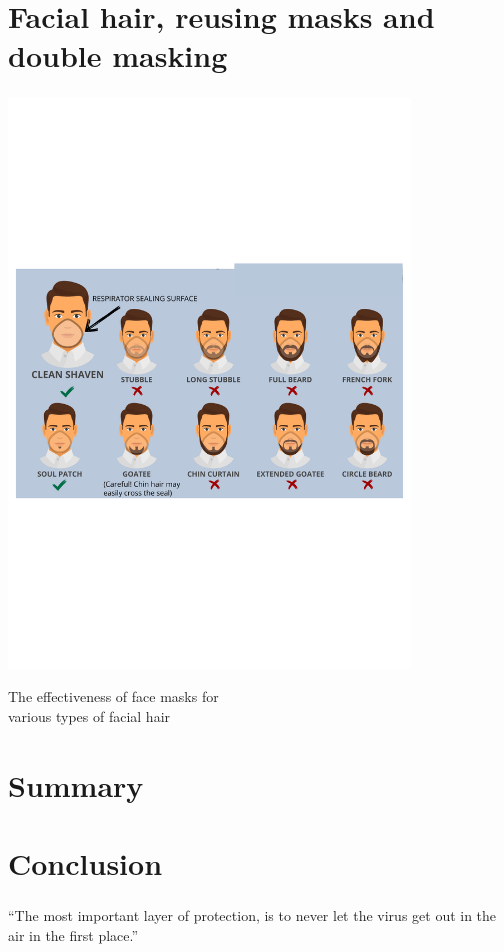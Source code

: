 \documentclass[c]{beamer}
\begin{document}
\section{Facial hair, reusing masks and double masking}
\begin{frame}
\frametitle{\insertsection}
\centering
\includegraphics[width=0.8\textwidth]{31}

The effectiveness of face masks for\\various types of facial hair
\end{frame}


\section*{Summary}
\begin{frame}
\frametitle{\insertsection}
\tableofcontents
\end{frame}

\section*{Conclusion}
\begin{frame}
\frametitle{\insertsection}
\begin{exampleblock}{}
  {\large ``The most important layer of protection, is to never let the virus get out in the air in the first place.''}
  \vskip5mm
  \hspace*{}\\
  \hspace*{}
\end{exampleblock}
\end{frame}
\end{document}
